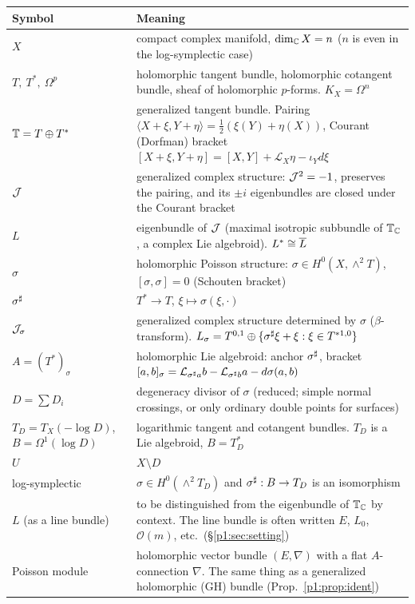 \begin{longtable}{>{\raggedright\arraybackslash}p{3.4cm}>{\raggedright\arraybackslash}p{11.6cm}}
\toprule Symbol & Meaning\\ \midrule\endhead
$X$ & compact complex manifold, $\dim_\mathbb C X=n$ ($n$ is even in the log-symplectic case)\\
$T,\ T^*,\ \Omega^p$ & holomorphic tangent bundle, holomorphic cotangent bundle, sheaf of holomorphic $p$-forms. $K_X=\Omega^n$\\
$\mathbb T=T\oplus T^*$ & generalized tangent bundle. Pairing $\langle X+\xi,Y+\eta\rangle=\tfrac12(\xi(Y)+\eta(X))$, Courant (Dorfman) bracket $[X+\xi,Y+\eta]=[X,Y]+\mathcal L_X\eta-\iota_Yd\xi$\\
$\mathcal J$ & generalized complex structure: $\mathcal J^2=-1$, preserves the pairing, and its $\pm i$ eigenbundles are closed under the Courant bracket\\
$L$ & eigenbundle of $\mathcal J$ (maximal isotropic subbundle of $\mathbb T_\mathbb C$, a complex Lie algebroid). $L^*\cong\overline L$\\
$\sigma$ & holomorphic Poisson structure: $\sigma\in H^0(X,\wedge^2T)$, $[\sigma,\sigma]=0$ (Schouten bracket)\\
$\sigma^\sharp$ & $T^*\to T$, $\xi\mapsto\sigma(\xi,\cdot)$\\
$\mathcal J_\sigma$ & generalized complex structure determined by $\sigma$ ($\beta$-transform). $L_\sigma=T^{0,1}\oplus\{\sigma^\sharp\xi+\xi:\xi\in T^{*1,0}\}$\\
$A=(T^*)_\sigma$ & holomorphic Lie algebroid: anchor $\sigma^\sharp$, bracket $[a,b]_\sigma=\mathcal L_{\sigma^\sharp a}b-\mathcal L_{\sigma^\sharp b}a-d\sigma(a,b)$\\
$D=\sum D_i$ & degeneracy divisor of $\sigma$ (reduced; simple normal crossings, or only ordinary double points for surfaces)\\
$T_D=T_X(-\log D)$,\ $B=\Omega^1(\log D)$ & logarithmic tangent and cotangent bundles. $T_D$ is a Lie algebroid, $B=T_D^*$\\
$U$ & $X\setminus D$\\
log-symplectic & $\sigma\in H^0(\wedge^2T_D)$ and $\sigma^\sharp:B\to T_D$ is an isomorphism\\
$L$ (as a line bundle) & to be distinguished from the eigenbundle of $\mathbb T_\mathbb C$ by context. The line bundle is often written $E$, $L_0$, $\mathcal O(m)$, etc.\ (\S\ref{p1:sec:setting})\\
Poisson module & holomorphic vector bundle $(E,\nabla)$ with a flat $A$-connection $\nabla$. The same thing as a generalized holomorphic (GH) bundle (Prop.~\ref{p1:prop:ident})\\

\end{longtable}
